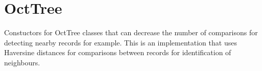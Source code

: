 \documentclass[letterpaper,10pt,english]{sphinxmanual}
\begin{document}
\begin{fulllineitems}
\begin{fulllineitems}
\begin{quote}
\begin{description}
\end{description}\end{quote}

\end{fulllineitems}


\end{fulllineitems}


\section{OctTree}
\label{\detokenize{users_guide:octtree}}\label{\detokenize{users_guide:module-GeoSpatialTools.octtree}}
\sphinxAtStartPar
Constuctors for OctTree classes that can decrease the number of comparisons
for detecting nearby records for example. This is an implementation that uses
Haversine distances for comparisons between records for identification of
neighbours.
\end{document}
